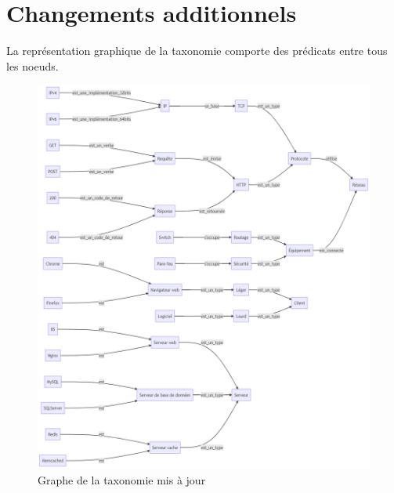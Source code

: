 \documentclass{article}
\begin{document}
\section{Changements additionnels}
La représentation graphique de la taxonomie comporte des prédicats entre tous les noeuds.
\begin{figure}[ht]
    \centering
    \includegraphics[width=\textwidth, height=\textheight, keepaspectratio]{../images/mermaid_v3.png}
    \caption{Graphe de la taxonomie mis à jour}
    \label{fig:Graphe de la taxonomie avec tous les prédicats}
\end{figure}
\end{document}
